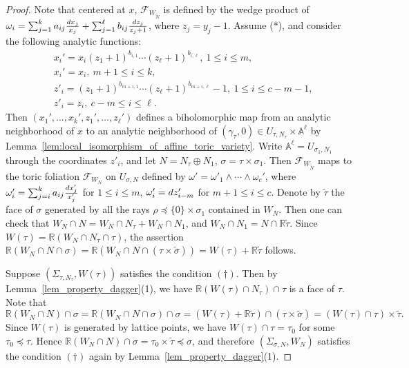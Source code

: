 \documentclass[12pt,reqno]{amsart}
\theoremstyle{definition}
\newcommand\cF{{\mathcal{F}}}
\newcommand\bA{{\mathbb A}}
\newcommand\bR{{\mathbb R}}
\newcommand{\diff}{\textnormal{d}}
\begin{document}
\begin{proof}
    Note that centered at $x$, $\cF_{W_{\widetilde N}}$ is defined by the wedge product of $\omega_i=\sum_{j=1}^ka_{ij}\frac{\diff x_j}{x_j}+\sum_{j=1}^{\ell}b_{ij}\frac{\diff z_{j}}{z_{j}+1}$, where $z_j=y_j-1$. Assume (*), and consider the following analytic functions:
    \begin{align*}
    &x_i'=x_i(z_1+1)^{b_{i,1}}\cdots(z_\ell+1)^{b_{i,\ell}},\ 1\leq i\leq m,\\
    &x_{i}'=x_{i},\ m+1\leq i\leq k,\\
    &z'_i=(z_1+1)^{b_{m+i,1}}\cdots (z_\ell+1)^{b_{m+i,\ell}}-1,\ 1\leq i\leq c-m-1,\\
    &z'_{i}=z_{i},\ c-m\leq i\leq \ell.
    \end{align*}
    Then $(x_1',\ldots,x_k',z_1',\ldots,z_\ell')$ defines a biholomorphic map from an analytic neighborhood of $x$ to an analytic neighborhood of $(\gamma_{\tau},0)\in U_{\tau,N_\tau}\times\bA^\ell$ by Lemma~\ref{lem:local_isomorphism_of_affine_toric_variety}. Write $\bA^\ell=U_{\sigma_1,N_1}$ through the coordinates $z'_i$, and let $N=N_\tau\oplus N_1$, $\sigma=\tau\times\sigma_1$. Then $\cF_{W_{\widetilde N}}$ maps to the toric foliation $\cF_{W_N}$ on $U_{\sigma,N}$ defined by $\omega'=\omega'_1\wedge\cdots\wedge\omega_c'$, where $\omega'_i=\sum_{j=i}^ka_{ij}\frac{\diff x_j'}{x_j'}$ for $1\leq i\leq m$, $\omega'_i=\diff z'_{i-m}$ for $m+1\leq i\leq c$. Denote by $\widetilde\tau$ the face of $\sigma$ generated by all the rays $\rho\preceq\{0\}\times\sigma_1$ contained in $W_N$.
    Then one can check that $W_N\cap N=W_N\cap N_\tau+W_N\cap N_1$, and $W_N\cap N_1=N\cap\bR\widetilde\tau$. Since $W(\tau) = \bR(W_N\cap N_\tau \cap \tau)$, the assertion $\bR(W_{N}\cap N\cap\sigma)=\bR(W_{N}\cap N\cap(\tau\times\widetilde\sigma))=W(\tau)+\bR\widetilde\tau$ follows.

    Suppose $(\Sigma_{\tau,N_\tau},W(\tau))$ satisfies the condition $(\dagger)$. 
    Then by Lemma~\ref{lem_property_dagger}(1), we have $\bR(W(\tau)\cap N_\tau) \cap \tau$ is a face of $\tau$. 
    Note that 
    \[\bR(W_N\cap N)\cap\sigma=\bR(W_N\cap N\cap\sigma)\cap\sigma=(W(\tau)+\bR\widetilde\tau)\cap(\tau\times\widetilde\sigma)=(W(\tau)\cap\tau)\times \widetilde\tau.\]
    Since $W(\tau)$ is generated by lattice points, we have $W(\tau)\cap \tau=\tau_0$ for some $\tau_0\preceq\tau$. Hence $\bR(W_N\cap N)\cap\sigma=\tau_0\times\widetilde\tau\preceq\sigma$,
    and therefore $(\Sigma_{\sigma,N},W_N)$ satisfies the condition $(\dagger)$ again by Lemma~\ref{lem_property_dagger}(1).


\end{proof}
\end{document}
